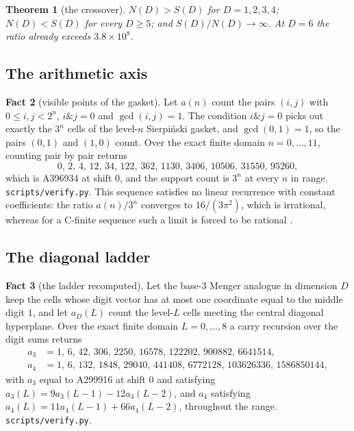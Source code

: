 \documentclass[11pt]{amsart}
\newtheorem{theorem}{Theorem}[section]
\theoremstyle{definition}
\newtheorem{fact}[theorem]{Fact}
\theoremstyle{remark}
\begin{document}
\begin{theorem}[the crossover]
\label{thm:crossover}
$N(D) > S(D)$ for $D = 1,2,3,4$; $N(D) < S(D)$ for every $D \ge 5$; and $S(D)/N(D) \to \infty$. At $D = 6$ the ratio already exceeds $3.8 \times 10^{8}$.
\end{theorem}

\subsection*{The arithmetic axis}

\begin{fact}[visible points of the gasket]
\label{fact:gasket}
Let $a(n)$ count the pairs $(i,j)$ with $0 \le i,j < 2^{n}$, $i \mathbin{\&} j = 0$ and $\gcd(i,j)=1$. The condition $i \mathbin{\&} j = 0$ picks out exactly the $3^{n}$ cells of the level-$n$ Sierpi\'nski gasket, and $\gcd(0,1)=1$, so the pairs $(0,1)$ and $(1,0)$ count. Over the exact finite domain $n = 0,\dots,11$, counting pair by pair returns
\[
  0,\,2,\,4,\,12,\,34,\,122,\,362,\,1130,\,3406,\,10506,\,31550,\,95260,
\]
which is A396934 \cite{a396934} at shift $0$, and the support count is $3^{n}$ at every $n$ in range. \texttt{scripts/\allowbreak verify.py}. This sequence satisfies no linear recurrence with constant coefficients: the ratio $a(n)/3^{n}$ converges to $16/(3\pi^{2})$, which is irrational, whereas for a C-finite sequence such a limit is forced to be rational \cite{coprimepaper}.
\end{fact}

\subsection*{The diagonal ladder}

\begin{fact}[the ladder recomputed]
\label{fact:ladder}
Let the base-$3$ Menger analogue in dimension $D$ keep the cells whose digit vector has at most one coordinate equal to the middle digit $1$, and let $a_{D}(L)$ count the level-$L$ cells meeting the central diagonal hyperplane. Over the exact finite domain $L = 0,\dots,8$ a carry recursion over the digit sums returns
\begin{align*}
  a_{3} &= 1,\,6,\,42,\,306,\,2250,\,16578,\,122202,\,900882,\,6641514,\\
  a_{4} &= 1,\,6,\,132,\,1848,\,29040,\,441408,\,6772128,\,103626336,\,1586850144,
\end{align*}
with $a_{3}$ equal to A299916 at shift $0$ and satisfying $a_{3}(L) = 9a_{3}(L-1)-12a_{3}(L-2)$, and $a_{4}$ satisfying $a_{4}(L) = 11a_{4}(L-1)+66a_{4}(L-2)$, throughout the range. \texttt{scripts/\allowbreak verify.py}.
\end{fact}
\end{document}
